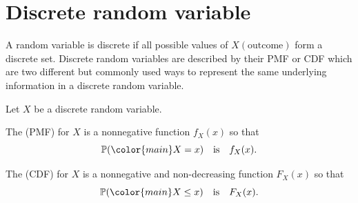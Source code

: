 \documentclass[../main.tex]{subfiles}
\begin{document}
 \section{Discrete random variable}

A random variable is discrete if all possible values of \(X(\text{outcome})\) form a discrete set. Discrete random variables  are described by their PMF or CDF which are two different but commonly used ways to represent the same underlying information in a discrete random variable.

\begin{definition} \label{def:pmf-cdf}
  Let \(X\) be a discrete random variable.

  The  (PMF) for \(X\) is a nonnegative function \(f_{X}(x)\) so that
  \[
    \mathbb{P}({\color{main} X = x})
    \quad\text{is}\quad
    f_{X}(x).
  \]

  The  (CDF) for \(X\) is a nonnegative and non-decreasing function \(F_{X}(x)\) so that
  \[
    \mathbb{P}({\color{main} X \le x})
    \quad\text{is}\quad
    F_{X}(x).
  \]
\end{definition}
\end{document}
